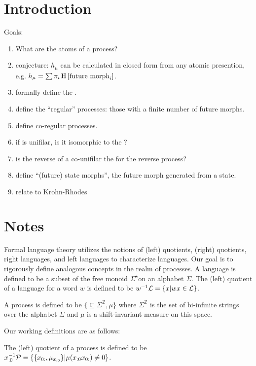 \documentclass[prl,twocolumn,showpacs,superscriptaddress,preprintnumbers,floatfix]{revtex4-1}
\theoremstyle{plain}    \newtheorem{Lem}{Lemma}
\theoremstyle{plain}    \newtheorem*{ProLem}{Proof}
\theoremstyle{plain}    \newtheorem{Cor}{Corollary}
\theoremstyle{plain}    \newtheorem*{ProCor}{Proof}
\theoremstyle{plain}    \newtheorem{The}{Theorem}
\theoremstyle{plain}    \newtheorem*{ProThe}{Proof}
\theoremstyle{plain}    \newtheorem{Prop}{Proposition}
\theoremstyle{plain}    \newtheorem*{ProProp}{Proof}
\theoremstyle{plain}    \newtheorem*{Conj}{Conjecture}
\theoremstyle{plain}    \newtheorem*{Rem}{Remark}
\theoremstyle{plain}    \newtheorem{Def}{Definition}
\theoremstyle{plain}    \newtheorem*{Not}{Notation}
\begin{document}



\section{Introduction}
\label{sec:introduction}

Goals:
\begin{enumerate}
  \item What are the atoms of a process?
  \item conjecture: $h_\mu$ can be calculated in closed form from any atomic
    presention, e.g. $h_\mu = \sum \pi_i \operatorname{H}\left[\textrm{future morph}_i\right]$.
  \item formally define the \eT.
  \item define the ``regular'' processes: those with a finite number of future
    morphs.
  \item define co-regular processes.
  \item if \eT is unifilar, is it isomorphic to the \eM?
  \item is the reverse of a co-unifilar \eM the \eM for the reverse
    process?
  \item define ``(future) state morphs'', the future morph generated from a
    state.
  \item relate to Krohn-Rhodes
\end{enumerate}

\section{Notes}

Formal language theory utilizes the notions of (left) quotients, (right)
quotients, right languages, and left languages to characterize languages. Our
goal is to rigorously define analogous concepts in the realm of processes. A
language \Language is defined to be a subset of the free monoid
$\Sigma^{\star}$on an alphabet $\Sigma$. The (left) quotient of a language
\Language for a word $w$ is defined to be $w^{-1}\mathcal{L} = \{ x | wx \in
\mathcal{L} \}$.

A process \Process is defined to be $\{\subseteq \Sigma^{\mathbb{Z}}, \mu\}$
where $\Sigma^{\mathbb{Z}}$ is the set of bi-infinite strings over the alphabet
$\Sigma$ and $\mu$ is a shift-invariant measure on this space.

Our working definitions are as follows:

The (left) quotient of a process \Process is defined to be ${x}_{:0}^{-1} \mathcal{P} =
\{ \{ {x}_{0:}, \mu_{{x}_{:0}} \} | \mu({x}_{:0} {x}_{0:}) \neq 0 \}$.
\end{document}

